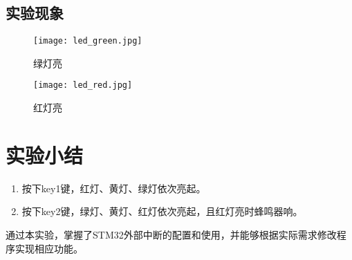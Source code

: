 \documentclass{math201}
\begin{document}
\subsection{实验现象}

\begin{figure}[H]
  \centering\texttt{[image: led\_green.jpg]}
  \caption{绿灯亮}      
\end{figure}

\begin{figure}[H]
  \centering\texttt{[image: led\_red.jpg]}
  \caption{红灯亮}
\end{figure}

\section{实验小结}

\begin{enumerate}
  \item 按下key1键，红灯、黄灯、绿灯依次亮起。
  \item 按下key2键，绿灯、黄灯、红灯依次亮起，且红灯亮时蜂鸣器响。
\end{enumerate}

通过本实验，掌握了STM32外部中断的配置和使用，并能够根据实际需求修改程序实现相应功能。
\end{document}
